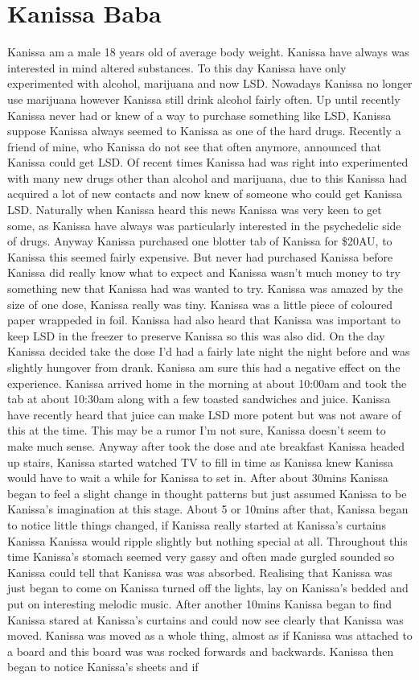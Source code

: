 \documentclass[12pt]{book}
\begin{document}
\chapter{Kanissa Baba}

Kanissa am a male 18 years old of average body weight. Kanissa have always was interested in mind altered substances. To this day Kanissa have only experimented with alcohol, marijuana and now LSD. Nowadays Kanissa no longer use marijuana however Kanissa still drink alcohol fairly often. Up until recently Kanissa never had or knew of a way to purchase something like LSD, Kanissa suppose Kanissa always seemed to Kanissa as one of the hard drugs. Recently a friend of mine, who Kanissa do not see that often anymore, announced that Kanissa could get LSD. Of recent times Kanissa had was right into experimented with many new drugs other than alcohol and marijuana, due to this Kanissa had acquired a lot of new contacts and now knew of someone who could get Kanissa LSD. Naturally when Kanissa heard this news Kanissa was very keen to get some, as Kanissa have always was particularly interested in the psychedelic side of drugs. Anyway Kanissa purchased one blotter tab of Kanissa for \$20AU, to Kanissa this seemed fairly expensive. But never had purchased Kanissa before Kanissa did really know what to expect and Kanissa wasn't much money to try something new that Kanissa had was wanted to try. Kanissa was amazed by the size of one dose, Kanissa really was tiny. Kanissa was a little piece of coloured paper wrappeded in foil. Kanissa had also heard that Kanissa was important to keep LSD in the freezer to preserve Kanissa so this was also did. On the day Kanissa decided take the dose I'd had a fairly late night the night before and was slightly hungover from drank. Kanissa am sure this had a negative effect on the experience. Kanissa arrived home in the morning at about 10:00am and took the tab at about 10:30am along with a few toasted sandwiches and juice. Kanissa have recently heard that juice can make LSD more potent but was not aware of this at the time. This may be a rumor I'm not sure, Kanissa doesn't seem to make much sense. Anyway after took the dose and ate breakfast Kanissa headed up stairs, Kanissa started watched TV to fill in time as Kanissa knew Kanissa would have to wait a while for Kanissa to set in. After about 30mins Kanissa began to feel a slight change in thought patterns but just assumed Kanissa to be Kanissa's imagination at this stage. About 5 or 10mins after that, Kanissa began to notice little things changed, if Kanissa really started at Kanissa's curtains Kanissa Kanissa would ripple slightly but nothing special at all. Throughout this time Kanissa's stomach seemed very gassy and often made gurgled sounded so Kanissa could tell that Kanissa was was absorbed. Realising that Kanissa was just began to come on Kanissa turned off the lights, lay on Kanissa's bedded and put on interesting melodic music. After another 10mins Kanissa began to find Kanissa stared at Kanissa's curtains and could now see clearly that Kanissa was moved. Kanissa was moved as a whole thing, almost as if Kanissa was attached to a board and this board was was rocked forwards and backwards. Kanissa then began to notice Kanissa's sheets and if 
\end{document}
